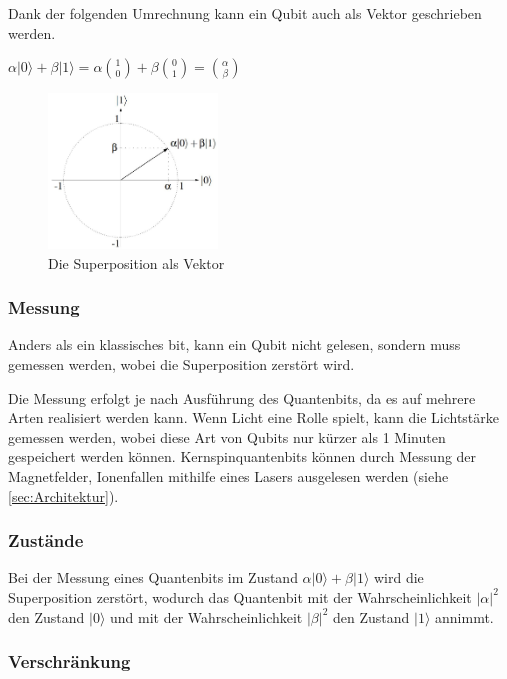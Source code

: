 Dank der folgenden Umrechnung kann ein Qubit auch als Vektor geschrieben werden.

$\alpha|0\rangle + \beta|1\rangle = \alpha\binom{1}{0} + \beta\binom{0}{1} = \binom{\alpha}{\beta}$

\begin{figure}[!htb]
	\centering\includegraphics[width=0.4\textwidth]{images/vektor.jpg}
	\caption{Die Superposition als Vektor}
	\label{vektor}
\end{figure}


\subsubsection{Messung}
\label{sec:Messung}

Anders als ein klassisches bit, kann ein Qubit nicht gelesen, sondern muss gemessen werden, wobei die Superposition zerstört wird.

Die Messung erfolgt je nach Ausführung des Quantenbits, da es auf mehrere Arten realisiert werden kann. Wenn Licht eine Rolle spielt, kann die Lichtstärke gemessen werden, wobei diese Art von Qubits nur kürzer als 1 Minuten gespeichert werden können. Kernspinquantenbits können durch Messung der Magnetfelder, Ionenfallen mithilfe eines Lasers ausgelesen werden (siehe \ref{sec:Architektur}).


\subsubsection{Zustände}
\label{sec:Zustaende}

Bei der Messung eines Quantenbits im Zustand $\alpha|0\rangle+\beta|1\rangle$ wird die Superposition zerstört, wodurch das Quantenbit mit der Wahrscheinlichkeit $|\alpha|^2$ den Zustand $|0\rangle$ und mit der Wahrscheinlichkeit $|\beta|^2$ den Zustand $|1\rangle$ annimmt.


\subsubsection{Verschränkung}
\label{sec:Verschraenkung}

